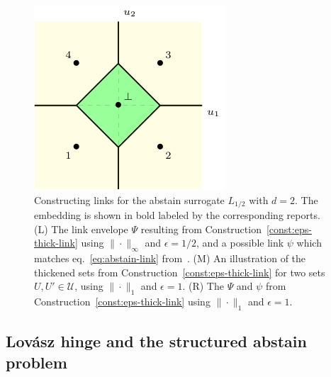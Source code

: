 \documentclass[11pt]{article}
\newcommand{\U}{\mathcal{U}}
\begin{document}
\begin{figure}
\begin{center}
\begin{minipage}{0.32\linewidth}
\end{minipage}\hfill
\begin{minipage}{0.32\linewidth}
\includegraphics[width=\linewidth]{tikz/abstain-link-l1.pdf}
\end{minipage}\hfill
\caption{Constructing links for the abstain surrogate $L_{1/2}$ with $d=2$. The embedding is shown in bold labeled by the corresponding reports. (L) The link envelope $\Psi$ resulting from Construction~\ref{const:eps-thick-link} using $\|\cdot\|_\infty$ and $\epsilon = 1/2$, and a possible link $\psi$ which matches eq.~\eqref{eq:abstain-link} from~\cite{ramaswamy2018consistent}.  (M) An illustration of the thickened sets from Construction~\ref{const:eps-thick-link} for two sets $U, U' \in \U$, using $\|\cdot\|_1$ and $\epsilon = 1$. (R) The $\Psi$ and $\psi$ from Construction~\ref{const:eps-thick-link} using $\|\cdot\|_1$ and $\epsilon = 1$.}
\label{fig:abstain-links}
\end{center}
\end{figure}


\subsection{Lov\'asz hinge and the structured abstain problem}
\label{sec:lovasz-hinge}

\newcommand{\dis}{\mathrm{dis}}
\newcommand{\abs}{\mathrm{abs}}
\end{document}
